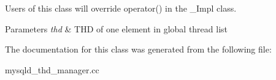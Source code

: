 Users of this class will override operator() in the \+\_\+\+Impl class.


\begin{DoxyParams}{Parameters}
{\em thd} & T\+HD of one element in global thread list \\
\hline
\end{DoxyParams}


The documentation for this class was generated from the following file\+:\begin{DoxyCompactItemize}
\item 
mysqld\+\_\+thd\+\_\+manager.\+cc\end{DoxyCompactItemize}
